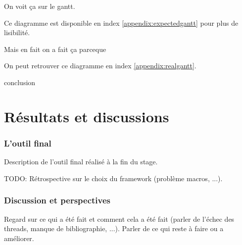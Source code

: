 \documentclass[a4paper]{article}
\begin{document}
On voit ça sur le gantt.

Ce diagramme est disponible en index \ref{appendix:expectedgantt} pour
plus de lisibilité.


Mais en fait on a fait ça parceque

On peut retrouver ce diagramme en index \ref{appendix:realgantt}.


conclusion

\clearpage
\part{Résultats et discussions}

\section{L'outil final}

Description de l'outil final réalisé à la fin du stage.

TODO: Rétrospective sur le choix du framework (problème macros, ...).

\clearpage

\section{Discussion et perspectives}

Regard sur ce qui a été fait et comment cela a été fait (parler de l'échec
des threads, manque de bibliographie, ...). Parler de ce qui reste à faire ou a
améliorer.
\end{document}

